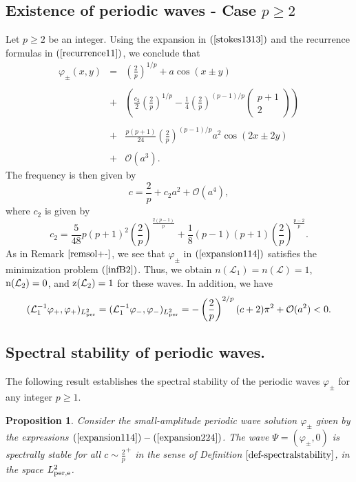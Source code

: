 \documentclass[12pt,reqno,a4paper]{amsart} %
\numberwithin{equation}{section}
\numberwithin{figure}{section}
\newtheorem{proposition}[theorem]{Proposition}
\begin{document}
\subsection{Existence of periodic waves - Case $p\geq2$}
	Let $p\geq2$ be an integer. Using the expansion in $(\ref{stokes1313})$ and the recurrence formulas in $(\ref{recurrence11})$, we conclude that 
	\begin{equation}\label{expansion114}\begin{array}{lllll}
		\varphi_{\pm}(x,y)&=&\displaystyle\left(\frac{2}{p}\right)^{1/p}+a\cos(x\pm y)\\\\
		&+&\displaystyle\left(\frac{c_2}{2}\left(\frac{2}{p}\right)^{1/p}-\frac{1}{4}\left(\frac{2}{p}\right)^{(p-1)/p}\left(\begin{array}{cccc}p+1 \\ 2\end{array}\right)\right)\\\\
		&+&\displaystyle\frac{p(p+1)}{24}\left(\frac{2}{p}\right)^{(p-1)/p}a^2\cos(2x\pm 2y)\\\\
		&+&\displaystyle\mathcal{O}(a^3).
\end{array}	\end{equation}
	The frequency is then given by
	\begin{equation}\label{expansion224}
		c=\frac{2}{p}+c_2a^2+\mathcal{O}(a^4),
	\end{equation}
	where $c_2$ is given by $$c_2 = \frac{5}{48} p(p+1)^2 \left( \frac{2}{p} \right)^{\frac{2(p-1)}{p}} + \frac{1}{8} (p-1)(p+1) \left( \frac{2}{p} \right)^{\frac{p-2}{p}}.$$
	\indent As in Remark $\ref{remsol+-}$, we see that $\varphi_{\pm}$ in $(\ref{expansion114})$ satisfies the minimization problem $(\ref{infB2})$. Thus, we obtain $n(\mathcal{L}_1) = n(\mathcal{L}) = 1$, ${\rm n}(\mathcal{L}_2) = 0$, and ${\rm z}(\mathcal{L}_2) = 1$ for these waves. In addition, we have 
	\begin{equation}\label{derc1212}
		(\mathcal{L}_1^{-1}\varphi_{+},\varphi_{+})_{L_{\rm per}^2} = (\mathcal{L}_1^{-1}\varphi_{-},\varphi_{-})_{L_{\rm per}^2} = -\left(\frac{2}{p}\right)^{2/p}(c+2)\pi^2 + \mathcal{O}(a^2) < 0.
	\end{equation}
	\subsection{Spectral stability of periodic waves.}
\indent The following result establishes the spectral stability of the periodic waves $\varphi_{\pm}$ for any integer $p \geq 1$.
\begin{proposition}\label{teo-1+}
	Consider the small-amplitude periodic wave solution $\varphi_{\pm}$ given by the expressions  $(\ref{expansion114})-(\ref{expansion224})$. The wave $\Psi = (\varphi_{\pm}, 0)$ is spectrally stable for all $c\sim\frac{2}{p}^{+}$ in the sense of Definition $\ref{def-spectralstability}$, in the space $L_{\rm per,e}^2$.
	\end{proposition}
\end{document}

